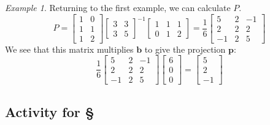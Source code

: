 \documentclass[11pt,oneside]{amsbook}
\theoremstyle{definition}
\theoremstyle{plain}
\theoremstyle{definition}
\theoremstyle{remark}
\newtheorem{example}[theorem]{Example}
\numberwithin{equation}{section}
\numberwithin{figure}{section}
\begin{document}
\begin{example}
  Returning to the first example, we can calculate $P$.
  \[P=\begin{bmatrix}1&0\\1&1\\1&2\end{bmatrix}
  \begin{bmatrix}3&3\\3&5\end{bmatrix}^{-1}
  \begin{bmatrix}1&1&1\\0&1&2\end{bmatrix}
  =\frac16\begin{bmatrix}5&2&-1\\2&2&2\\-1&2&5\end{bmatrix}
  \]
  We see that this matrix multiplies $\mathbf{b}$ to give the projection $\mathbf{p}$:
  \[\frac16\begin{bmatrix}5&2&-1\\2&2&2\\-1&2&5\end{bmatrix}
  \begin{bmatrix}6\\0\\0\end{bmatrix}
  =\begin{bmatrix}5\\2\\-1\end{bmatrix}
  \]
\end{example}

\newpage
\subsection*{Activity for \S \thesection}
\end{document}
